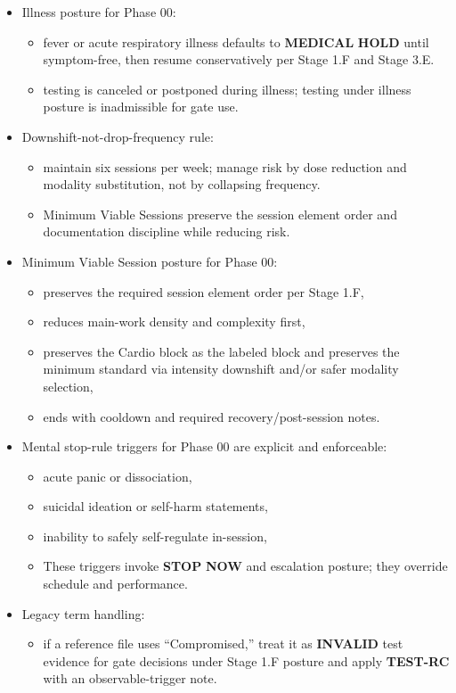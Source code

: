 \documentclass[10pt]{article}
\begin{document}
\begin{itemize}
\begin{itemize}
\begin{itemize}
    \end{itemize}
  \end{itemize}
\item Illness posture for Phase 00:
  \begin{itemize}
  \item fever or acute respiratory illness defaults to \textbf{MEDICAL} \textbf{HOLD} until symptom-free, then resume conservatively per Stage 1.F and Stage 3.E.
  \item testing is canceled or postponed during illness; testing under illness posture is inadmissible for gate use.
  \end{itemize}
\item Downshift-not-drop-frequency rule:
  \begin{itemize}
  \item maintain six sessions per week; manage risk by dose reduction and modality substitution, not by collapsing frequency.
  \item Minimum Viable Sessions preserve the session element order and documentation discipline while reducing risk.
  \end{itemize}
\item Minimum Viable Session posture for Phase 00:
  \begin{itemize}
  \item preserves the required session element order per Stage 1.F,
  \item reduces main-work density and complexity first,
  \item preserves the Cardio block as the labeled block and preserves the minimum standard via intensity downshift and/or safer modality selection,
  \item ends with cooldown and required recovery/post-session notes.
  \end{itemize}
\item Mental stop-rule triggers for Phase 00 are explicit and enforceable:
  \begin{itemize}
  \item acute panic or dissociation,
  \item suicidal ideation or self-harm statements,
  \item inability to safely self-regulate in-session,
  \item These triggers invoke \textbf{STOP} \textbf{NOW} and escalation posture; they override schedule and performance.
  \end{itemize}
\item Legacy term handling:
  \begin{itemize}
  \item if a reference file uses “Compromised,” treat it as \textbf{INVALID} test evidence for gate decisions under Stage 1.F posture and apply \textbf{TEST-RC} with an observable-trigger note.
  \end{itemize}
\end{itemize}
\end{document}
